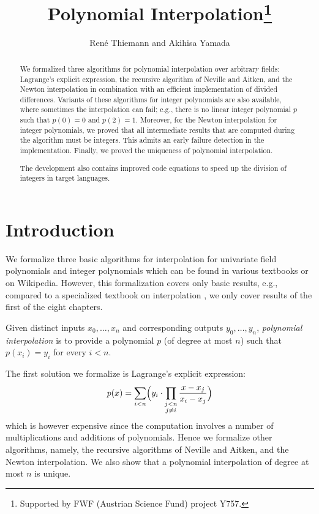 \documentclass[11pt,a4paper]{article}
\begin{document}
\title{Polynomial Interpolation\footnote{Supported by FWF (Austrian Science Fund) project Y757.}}
\author{Ren\'e Thiemann and Akihisa Yamada}
\maketitle

\begin{abstract}
We formalized three algorithms for polynomial interpolation over arbitrary fields: 
Lagrange's explicit expression,
the recursive algorithm of Neville and Aitken,
and the Newton interpolation in combination with an efficient implementation of divided differences.
Variants of these algorithms for integer polynomials are also available,
where sometimes the interpolation can fail; e.g., there is no
linear integer polynomial $p$ such that $p(0) = 0$ and $p(2) = 1$. Moreover, for
the Newton interpolation for integer polynomials, we proved that all intermediate 
results that are computed during the algorithm must be integers.
This admits an early failure detection in the implementation.
Finally, we proved the uniqueness of polynomial interpolation.

The development also contains improved code equations to speed up the division of integers
in target languages.
\end{abstract}

\tableofcontents

\section{Introduction}

We formalize three basic algorithms for interpolation for univariate 
field polynomials and integer polynomials which can be found in 
various textbooks or on Wikipedia. However, this formalization covers 
only basic results, e.g., compared to a specialized textbook on 
interpolation \cite{interpolation}, we only cover results of the first of the eight chapters.

Given distinct inputs $x_0,\dots,x_n$ and corresponding outputs $y_0,\dots,y_n$,
\emph{polynomial interpolation} is to provide a polynomial $p$ (of degree at most $n$)
such that $p(x_i) = y_i$ for every $i < n$.

The first solution we formalize is Lagrange's explicit expression:
\[
	p(x) = \sum_{i<n}
		\Bigl(y_i \cdot \prod_{\substack{j<n\\j \neq i}}\frac{x-x_j}{x_i-x_j}
		\Bigr)
\]
which is however expensive since the computation involves a number of multiplications and additions of polynomials.
Hence we formalize other algorithms, namely, the recursive algorithms of Neville and Aitken,
and the Newton interpolation.
We also show that a polynomial interpolation of degree at most $n$ is unique.
\end{document}
